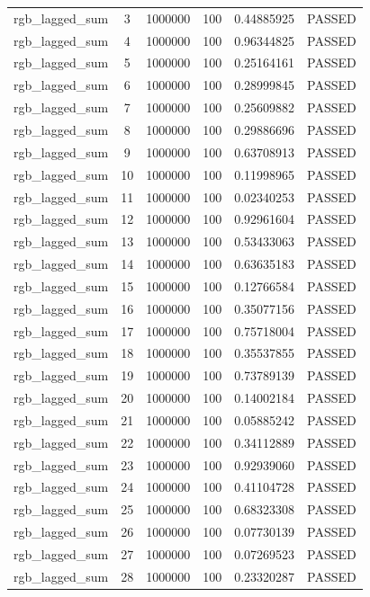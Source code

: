 \begin{longtable}{cccccc}
rgb\_lagged\_sum & 3 & 1000000 & 100 & 0.44885925 & PASSED \\
rgb\_lagged\_sum & 4 & 1000000 & 100 & 0.96344825 & PASSED \\
rgb\_lagged\_sum & 5 & 1000000 & 100 & 0.25164161 & PASSED \\
rgb\_lagged\_sum & 6 & 1000000 & 100 & 0.28999845 & PASSED \\
rgb\_lagged\_sum & 7 & 1000000 & 100 & 0.25609882 & PASSED \\
rgb\_lagged\_sum & 8 & 1000000 & 100 & 0.29886696 & PASSED \\
rgb\_lagged\_sum & 9 & 1000000 & 100 & 0.63708913 & PASSED \\
rgb\_lagged\_sum & 10 & 1000000 & 100 & 0.11998965 & PASSED \\
rgb\_lagged\_sum & 11 & 1000000 & 100 & 0.02340253 & PASSED \\
rgb\_lagged\_sum & 12 & 1000000 & 100 & 0.92961604 & PASSED \\
rgb\_lagged\_sum & 13 & 1000000 & 100 & 0.53433063 & PASSED \\
rgb\_lagged\_sum & 14 & 1000000 & 100 & 0.63635183 & PASSED \\
rgb\_lagged\_sum & 15 & 1000000 & 100 & 0.12766584 & PASSED \\
rgb\_lagged\_sum & 16 & 1000000 & 100 & 0.35077156 & PASSED \\
rgb\_lagged\_sum & 17 & 1000000 & 100 & 0.75718004 & PASSED \\
rgb\_lagged\_sum & 18 & 1000000 & 100 & 0.35537855 & PASSED \\
rgb\_lagged\_sum & 19 & 1000000 & 100 & 0.73789139 & PASSED \\
rgb\_lagged\_sum & 20 & 1000000 & 100 & 0.14002184 & PASSED \\
rgb\_lagged\_sum & 21 & 1000000 & 100 & 0.05885242 & PASSED \\
rgb\_lagged\_sum & 22 & 1000000 & 100 & 0.34112889 & PASSED \\
rgb\_lagged\_sum & 23 & 1000000 & 100 & 0.92939060 & PASSED \\
rgb\_lagged\_sum & 24 & 1000000 & 100 & 0.41104728 & PASSED \\
rgb\_lagged\_sum & 25 & 1000000 & 100 & 0.68323308 & PASSED \\
rgb\_lagged\_sum & 26 & 1000000 & 100 & 0.07730139 & PASSED \\
rgb\_lagged\_sum & 27 & 1000000 & 100 & 0.07269523 & PASSED \\
rgb\_lagged\_sum & 28 & 1000000 & 100 & 0.23320287 & PASSED \\

\end{longtable}
